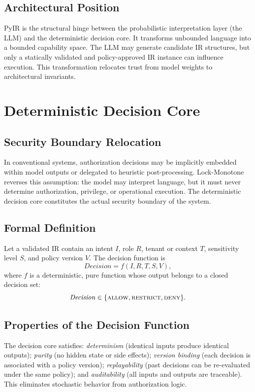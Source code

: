 \documentclass[conference]{IEEEtran}
\begin{document}
\subsection{Architectural Position}
PyIR is the structural hinge between the probabilistic interpretation
layer (the LLM) and the deterministic decision core. It transforms
unbounded language into a bounded capability space. The LLM may generate
candidate IR structures, but only a statically validated and
policy-approved IR instance can influence execution. This transformation
relocates trust from model weights to architectural invariants.

\section{Deterministic Decision Core}
\label{sec:core}

\subsection{Security Boundary Relocation}
In conventional systems, authorization decisions may be implicitly
embedded within model outputs or delegated to heuristic post-processing.
Lock-Monotone reverses this assumption: the model may interpret language,
but it must never determine authorization, privilege, or operational
execution. The deterministic decision core constitutes the actual security
boundary of the system.

\subsection{Formal Definition}
Let a validated IR contain an intent $I$, role $R$, tenant or context $T$,
sensitivity level $S$, and policy version $V$. The decision function is
\[
\mathit{Decision} = f(I, R, T, S, V),
\]
where $f$ is a deterministic, pure function whose output belongs to a
closed decision set:
\[
\mathit{Decision} \in \{\textsc{allow}, \textsc{restrict}, \textsc{deny}\}.
\]

\subsection{Properties of the Decision Function}
The decision core satisfies: \emph{determinism} (identical inputs produce
identical outputs); \emph{purity} (no hidden state or side effects);
\emph{version binding} (each decision is associated with a policy
version); \emph{replayability} (past decisions can be re-evaluated under
the same policy); and \emph{auditability} (all inputs and outputs are
traceable). This eliminates stochastic behavior from authorization logic.
\end{document}
